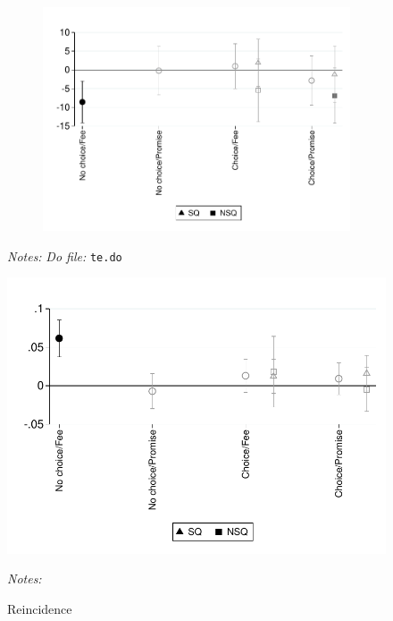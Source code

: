 \documentclass[11pt]{article}
\begin{document}
\begin{figure}[H]
\begin{center}
\begin{subfigure}{0.4\textwidth}
        \includegraphics[width=\textwidth]{Figuras/te_graph_dias_al_desempenyo.pdf}
    \end{subfigure}
    \end{center}
     \footnotesize \textit{Notes: } 
      \footnotesize{ \textit{Do file: }  \texttt{te.do}}
\end{figure}

\begin{figure}[H]
        \caption{Reincidence}
    \label{reincidence_welfare}
    \begin{center}
        \centering
        \includegraphics[width=\textwidth]{Figuras/te_graph_reincidence.pdf}
    \end{center}
     \footnotesize \textit{Notes: } 
      \footnotesize{ }
\end{figure}
\end{document}
